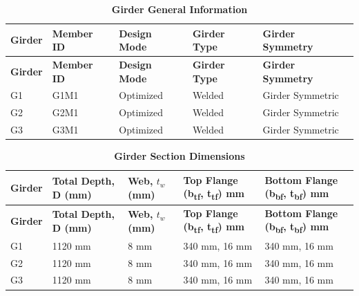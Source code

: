 \documentclass[12pt,a4paper]{report}
\numberwithin{table}{chapter}
\numberwithin{figure}{chapter}
\begin{document}
\newpage

\vspace{0.4em}
\noindent
            
\vspace{4pt}
\begin{longtable}{|L{2.2cm}|L{1.8cm}|p{3.8cm}|p{3.8cm}|p{3.8cm}|}
\caption{\textbf{Girder General Information}}\\
\hline
\textbf{Girder} & \textbf{Member ID} & \textbf{Design Mode} & \textbf{Girder Type} & \textbf{Girder Symmetry} \\[6pt]
\hline
\endfirsthead

\hline
\textbf{Girder} & \textbf{Member ID} & \textbf{Design Mode} & \textbf{Girder Type} & \textbf{Girder Symmetry} \\[6pt]
\hline
\endhead
\hline
\endlastfoot
G1 & G1M1 & Optimized & Welded & Girder Symmetric \\[8pt]
\hline
G2 & G2M1 & Optimized & Welded & Girder Symmetric \\[8pt]
\hline
G3 & G3M1 & Optimized & Welded & Girder Symmetric \\[8pt]
\end{longtable}

\vspace{0.6em}

\vspace{4pt}
\begin{longtable}{|L{1.8cm}|L{2.3cm}|L{1.8cm}|p{4.8cm}|p{4.8cm}|}
\caption{\textbf{Girder Section Dimensions}}\\
\hline
\textbf{Girder} & \textbf{Total Depth, D (mm)} & \textbf{Web, $t_w$ (mm)} & \textbf{Top Flange (b\textsubscript{tf}, t\textsubscript{tf}) mm} & \textbf{Bottom Flange (b\textsubscript{bf}, t\textsubscript{bf}) mm} \\[6pt]
\hline
\endfirsthead

\hline
\textbf{Girder} & \textbf{Total Depth, D (mm)} & \textbf{Web, $t_w$ (mm)} & \textbf{Top Flange (b\textsubscript{tf}, t\textsubscript{tf}) mm} & \textbf{Bottom Flange (b\textsubscript{bf}, t\textsubscript{bf}) mm} \\[6pt]
\hline
\endhead
\hline
\endlastfoot
G1 & 1120 mm & 8 mm & 340 mm, 16 mm & 340 mm, 16 mm \\[8pt]
\hline
G2 & 1120 mm & 8 mm & 340 mm, 16 mm & 340 mm, 16 mm \\[8pt]
\hline
G3 & 1120 mm & 8 mm & 340 mm, 16 mm & 340 mm, 16 mm \\[8pt]
\end{longtable}
\end{document}
